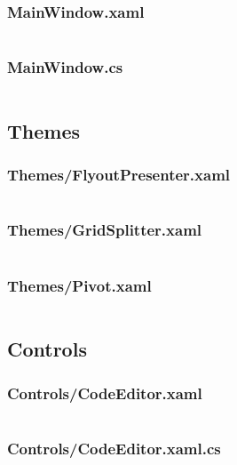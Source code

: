 \documentclass[a4paper]{report}
\begin{document}
\subsubsection{MainWindow.xaml}

\inputminted{xml}{"../src/Algorithm Dynamics/MainWindow.xaml"}

\subsubsection{MainWindow.cs}

\inputminted{csharp}{"../src/Algorithm Dynamics/MainWindow.xaml.cs"}

\subsection{Themes}

\subsubsection{Themes/FlyoutPresenter.xaml}

\inputminted{xml}{"../src/Algorithm Dynamics/Themes/FlyoutPresenter.xaml"}

\subsubsection{Themes/GridSplitter.xaml}

\inputminted{xml}{"../src/Algorithm Dynamics/Themes/GridSplitter.xaml"}

\subsubsection{Themes/Pivot.xaml}

\inputminted{xml}{"../src/Algorithm Dynamics/Themes/Pivot.xaml"}

\subsection{Controls}

\subsubsection{Controls/CodeEditor.xaml}

\inputminted{xml}{"../src/Algorithm Dynamics/Controls/CodeEditor.xaml"}

\subsubsection{Controls/CodeEditor.xaml.cs}
\end{document}
